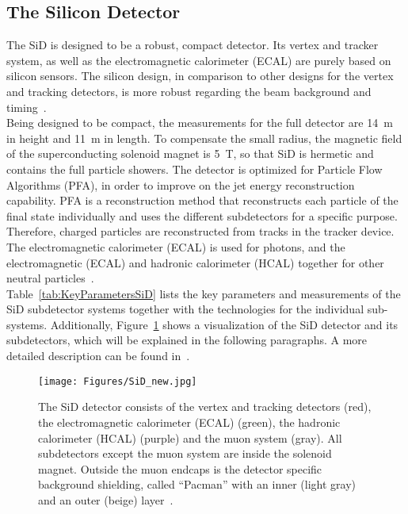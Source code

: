 \subsection{The Silicon Detector}
\label{ILC:SiD}
The SiD is designed to be a robust, compact detector.
Its vertex and tracker system, as well as the electromagnetic calorimeter (ECAL) are purely based on silicon sensors.
The silicon design, in comparison to other designs for the vertex and tracking detectors, is more robust regarding the beam background and timing~\cite[cf. p. 57ff]{TDR4}.
\\Being designed to be compact, the measurements for the full detector are \SI{14}{m} in height and \SI{11}{m} in length.
To compensate the small radius, the magnetic field of the superconducting solenoid magnet is \SI{5}{T}, so that SiD is hermetic and contains the full particle showers.
The detector is optimized for Particle Flow Algorithms (PFA), in order to improve on the jet energy reconstruction capability.
PFA is a reconstruction method that reconstructs each particle of the final state individually and uses the different subdetectors for a specific purpose.
Therefore, charged particles are reconstructed from tracks in the tracker device.
The electromagnetic calorimeter (ECAL) is used for photons, and the electromagnetic (ECAL) and hadronic calorimeter (HCAL) together for other neutral particles~\cite{PFA}.
\\Table~\ref{tab:KeyParametersSiD} lists the key parameters and measurements of the SiD subdetector systems together with the technologies for the individual sub-systems.
Additionally, Figure~\ref{fig:SiD} shows a visualization of the SiD detector and its subdetectors, which will be explained in the following paragraphs.
A more detailed description can be found in~\cite{TDR4}.
\begin{figure}[h]
\centering
\texttt{[image: Figures/SiD\_new.jpg]}
\caption[Visualization of the SiD detector]{The SiD detector consists of the vertex and tracking detectors (red), the electromagnetic calorimeter (ECAL) (green), the hadronic calorimeter (HCAL) (purple) and the muon system (gray).
All subdetectors except the muon system are inside the solenoid magnet.
Outside the muon endcaps is the detector specific background shielding, called ``Pacman'' with an inner (light gray) and an outer (beige) layer~\cite{SiD_Geo}.}
\label{fig:SiD}
\end{figure}

